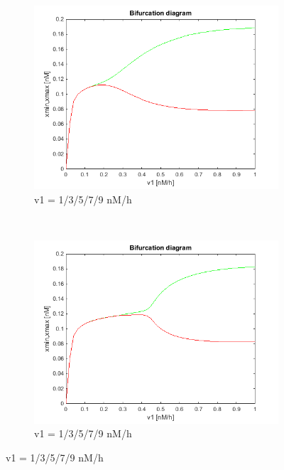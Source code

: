 \documentclass[10pt,a4paper,oneside,twocolumn]{article}
\numberwithin{equation}{section} %
\begin{document}
    \begin{figure}
	\centering
	    \begin{subfigure}[b]{0.45\textwidth}
		\includegraphics[width=\textwidth]{Bifurcation.png}
		\caption{v1 = 1/3/5/7/9 nM/h}
	    \end{subfigure}
	     ~ 
	    \begin{subfigure}[b]{0.45\textwidth}
		\includegraphics[width=\textwidth]{Bifurcation10000.png}
		\caption{v1 = 1/3/5/7/9 nM/h}
	    \end{subfigure}
    \end{figure}
\end{document}
